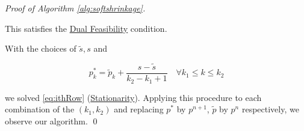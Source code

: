 \begin{proof}[Proof of Algorithm \ref{alg:softshrinkage}]
\begin{enumerate}
            This satisfies the \underline{Dual Feasibility} condition.



        \end{enumerate}

        With the choices of $\tilde{s}, s$ and

            $$p^{\ast}_{k} = \tilde{p}_{k} + \frac{s - \tilde{s}}{k_{2} - k_{1} + 1} \,\,\,\,\,\, \forall k_{1} \le k \le k_{2}$$

        we solved \ref{eq:ithRow} (\underline{Stationarity}). Applying this procedure to each combination of the $(k_{1}, k_{2})$ and replacing $p^{\ast}$ by $p^{n+1}$, $\tilde{p}$ by $p^{n}$ respectively, we observe our algorithm.
        \qed
    \end{proof}



